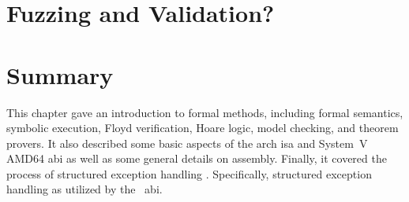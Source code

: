 \section{Fuzzing and Validation?}

\section{Summary}
This chapter gave an introduction to formal methods, including formal semantics,
symbolic execution, Floyd verification, Hoare logic, model checking, and theorem provers.
It also described some basic aspects of the \gls{arch} \ac{isa} and System~V
AMD64 \ac{abi}
as well as some general details on assembly.
Finally, it covered the process of structured exception handling%
.
Specifically, structured exception handling as utilized by the \Cpp\ \ac{abi}.
